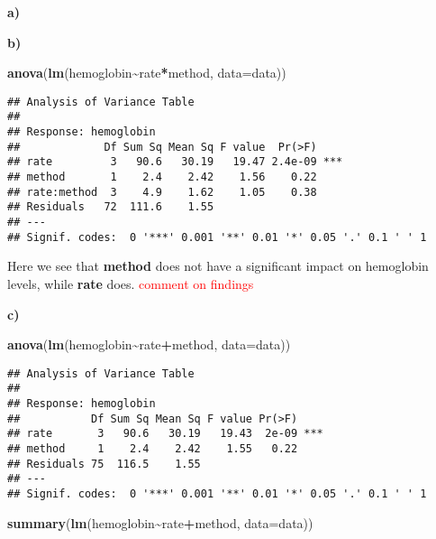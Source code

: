 \documentclass[
]{article}
\newenvironment{Shaded}{\begin{snugshade}}{\end{snugshade}}
\newcommand{\AttributeTok}[1]{\textcolor[rgb]{0.13,0.29,0.53}{#1}}
\newcommand{\FunctionTok}[1]{\textcolor[rgb]{0.13,0.29,0.53}{\textbf{#1}}}
\newcommand{\NormalTok}[1]{#1}
\newcommand{\SpecialCharTok}[1]{\textcolor[rgb]{0.81,0.36,0.00}{\textbf{#1}}}
\begin{document}
\textbf{a)}

\textbf{b)}

\begin{Shaded}
\begin{Highlighting}[]
\FunctionTok{anova}\NormalTok{(}\FunctionTok{lm}\NormalTok{(hemoglobin}\SpecialCharTok{\textasciitilde{}}\NormalTok{rate}\SpecialCharTok{*}\NormalTok{method, }\AttributeTok{data=}\NormalTok{data))}
\end{Highlighting}
\end{Shaded}

\begin{verbatim}
## Analysis of Variance Table
## 
## Response: hemoglobin
##             Df Sum Sq Mean Sq F value  Pr(>F)    
## rate         3   90.6   30.19   19.47 2.4e-09 ***
## method       1    2.4    2.42    1.56    0.22    
## rate:method  3    4.9    1.62    1.05    0.38    
## Residuals   72  111.6    1.55                    
## ---
## Signif. codes:  0 '***' 0.001 '**' 0.01 '*' 0.05 '.' 0.1 ' ' 1
\end{verbatim}

Here we see that \textbf{method} does not have a significant impact on
hemoglobin levels, while \textbf{rate} does.
\textcolor{red}{comment on findings}

\textbf{c)}

\begin{Shaded}
\begin{Highlighting}[]
\FunctionTok{anova}\NormalTok{(}\FunctionTok{lm}\NormalTok{(hemoglobin}\SpecialCharTok{\textasciitilde{}}\NormalTok{rate}\SpecialCharTok{+}\NormalTok{method, }\AttributeTok{data=}\NormalTok{data))}
\end{Highlighting}
\end{Shaded}

\begin{verbatim}
## Analysis of Variance Table
## 
## Response: hemoglobin
##           Df Sum Sq Mean Sq F value Pr(>F)    
## rate       3   90.6   30.19   19.43  2e-09 ***
## method     1    2.4    2.42    1.55   0.22    
## Residuals 75  116.5    1.55                   
## ---
## Signif. codes:  0 '***' 0.001 '**' 0.01 '*' 0.05 '.' 0.1 ' ' 1
\end{verbatim}

\begin{Shaded}
\begin{Highlighting}[]
\FunctionTok{summary}\NormalTok{(}\FunctionTok{lm}\NormalTok{(hemoglobin}\SpecialCharTok{\textasciitilde{}}\NormalTok{rate}\SpecialCharTok{+}\NormalTok{method, }\AttributeTok{data=}\NormalTok{data))}
\end{Highlighting}
\end{Shaded}
\end{document}

